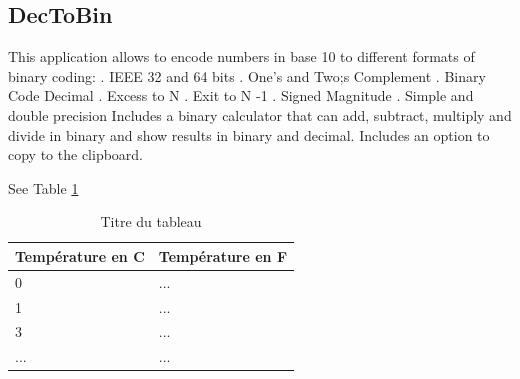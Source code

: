  \subsection{DecToBin}
 This application allows to encode numbers in base 10 to different formats of binary coding:
 . IEEE 32 and 64 bits
 . One's and Two;s Complement
 . Binary Code Decimal
 . Excess to N
 . Exit to N -1
 . Signed Magnitude
 . Simple and double precision
 Includes a binary calculator that can add, subtract, multiply and divide in binary and show results in binary and decimal.
 Includes an option to copy to the clipboard.
 

See Table \ref{tab:tableau1}

\begin{table}[h!]
\begin{center}
	\begin{tabular}{|l|l|}
		\hline
		\textbf{Température en C} & \textbf{Température en F} \\
		\hline
		\hline
		0 & ... \\
		\hline
		1 & ... \\
		\hline
		3 & ... \\
		\hline
		... & ... \\
		\hline
	\end{tabular}
\end{center}
\caption{Titre du tableau}
\label{tab:tableau1}
\end{table}


